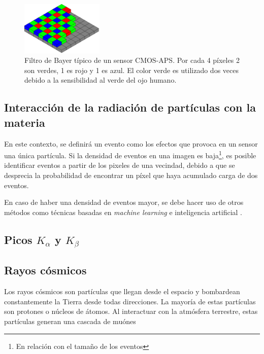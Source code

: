 \documentclass[twoside,twocolumn]{article}
\begin{document}
      \begin{figure}[h]
        \includegraphics[width=0.35\textwidth]{figures/Bayer_pattern.png}
        \caption{Filtro de Bayer típico de un sensor CMOS-APS. Por cada 4 píxeles 2 son verdes, 1 es rojo y 1 es azul.
          El color verde es utilizado dos veces debido a la sensibilidad al verde del ojo humano.}
        \label{fig:bayer}
      \end{figure}

    \subsection{Interacción de la radiación de partículas con la materia}\label{sec:intro:radiation}

      En este contexto, se definirá un evento como los efectos que provoca en un sensor una única partícula.
      Si la densidad de eventos en una imagen es baja\footnote{En relación con el tamaño de los eventos},
      es posible identificar eventos a partir de los pixeles de una vecindad,
      debido a que se desprecia la probabilidad de encontrar un píxel que haya acumulado carga de dos eventos.

      En caso de haber una densidad de eventos mayor, se debe hacer uso de otros métodos como técnicas basadas en \emph{machine learning}
      e inteligencia artificial \cite{ROE2005577}.  %
      
    \subsection{Picos $K_{\alpha}$ y $K_{\beta}$}\label{sec:intro:peaks}

    \subsection{Rayos cósmicos}\label{sec:intro:cosmic_ray}
      Los rayos cósmicos son partículas que llegan desde el espacio y bombardean constantemente la Tierra desde todas direcciones.
      La mayoría de estas partículas son protones o núcleos de átomos.
      Al interactuar con la atmósfera terrestre, estas partículas generan una cascada de muónes %
\end{document}
